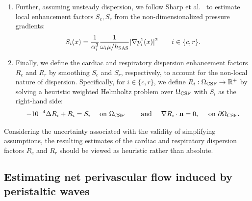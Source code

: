 \documentclass[fleqn,10pt]{wlscirep}
\begin{document}
\begin{enumerate}[label=\roman*)]
\begin{equation}
    p^1_i(x) = \left ( 1 + \frac{\alpha_i^2}{8} \right ) p_i^0(x)
    \qquad \text{for } x \in \Omega_{\rm CSF}, \qquad i \in \{c, r\}.
  \end{equation}
  Note that this scaling is based on theoretical considerations on the
  ratio of oscillatory flow to steady flow impedances in a
  tube~\cite[Chap.~4.3.]{van1998cardiovascular}.
\item
  Further, assuming unsteady dispersion, we follow Sharp et
  al.~\cite{sharp2019dispersion} to estimate local enhancement factors
  $S_c, S_r$ from the non-dimensionalized pressure gradients:
  \begin{equation}
    S_i(x) = \frac{1}{\alpha_i^3} \frac{1}{\omega_i \mu/h_{\rm SAS}} | \nabla p_i^1(x) |^2
    \qquad i \in \{c, r\}.
  \end{equation}
\item
  Finally, we define the cardiac and respiratory dispersion
  enhancement factors $R_c$ and $R_r$ by smoothing $S_c$ and $S_r$,
  respectively, to account for the non-local nature of
  dispersion. Specifically, for $i \in \{c, r\}$, we define $R_i :
  \Omega_{\rm CSF} \rightarrow \mathbb{R}^{+}$ by solving a heuristic weighted
  Helmholtz problem over $\Omega_{\rm CSF}$ with $S_i$ as the
  right-hand side:
  \begin{equation}
    - 10^{-4} \Delta R_i + R_i
    = S_i \quad \text{ on } \Omega_{\rm CSF}
    \qquad \text{ and } \quad
    \nabla R_i \cdot \mathbf{n} = 0, \quad \text{ on } \partial \Omega_{\rm CSF} .
\end{equation}
\end{enumerate}
Considering the uncertainty associated with the validity of
simplifying assumptions, the resulting estimates of the cardiac and
respiratory dispersion factors $R_c$ and $R_r$ 
should be viewed as heuristic rather than absolute.

\subsection{Estimating net perivascular flow induced by peristaltic waves}
\label{sec:app:peristalsis}
\end{document}
